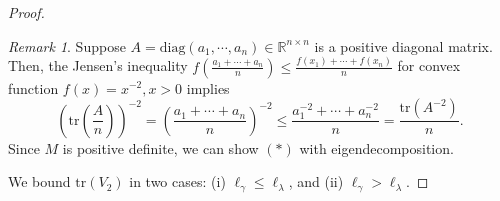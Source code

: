 \documentclass{article}
\theoremstyle{plain}
\theoremstyle{definition}
\theoremstyle{remark}
\newtheorem{remark}[theorem]{Remark}
\begin{document}
\begin{appendix}
\begin{proof}
\begin{remark}\label{rem:variance-Jensen-inequ}
    Suppose $A = \text{diag}(a_1, \cdots, a_n) \in \mathbb{R}^{n \times n}$ is a positive diagonal matrix. 
    Then, the Jensen's inequality $f\left( \frac{a_1 + \cdots + a_n}{n} \right) \leq \frac{f(x_1) + \cdots + f(x_n)}{n}$ for convex function \( f(x) = x^{-2}, x>0 \) implies
    $$
    \left( \text{tr}\left( \frac{A}{n} \right) \right)^{-2} = \left( \frac{a_1 + \cdots + a_n}{n} \right)^{-2} \leq \frac{a_1^{-2} + \cdots + a_n^{-2}}{n} = \frac{\text{tr}(A^{-2})}{n}.
    $$
Since $M$ is positive definite, we can show $(\ast)$ with eigendecomposition.
\end{remark}


We bound $\mathrm{tr}(V_2)$ in two cases: (i) $\ell_{\gamma} \leq \ell_{\lambda}$, and (ii) $\ell_{\gamma} > \ell_{\lambda}$.


\end{proof}
\end{appendix}
\end{document}

